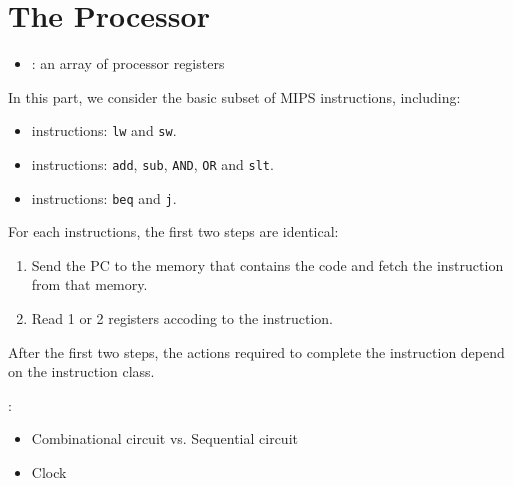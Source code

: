 \chapter{The Processor}

    \begin{itemize}
      \item {}: an array of processor registers
    \end{itemize}

    \par In this part, we consider the basic subset of MIPS instructions,
    including:
    \begin{itemize}
      \item {} instructions: \lstinline{lw} and
        \lstinline{sw}.
      \item {} instructions: \lstinline{add},
        \lstinline{sub}, \lstinline{AND}, \lstinline{OR} and \lstinline{slt}.
      \item {} instructions: \lstinline{beq} and \lstinline{j}.
    \end{itemize}
    \par For each instructions, the first two steps are identical:
    \begin{enumerate}[1.]
      \item Send the PC to the memory that contains the code and fetch the
        instruction from that memory.
      \item Read 1 or 2 registers accoding to the instruction.
    \end{enumerate}
    \par After the first two steps, the actions required to complete the
      instruction depend on the instruction class.


  \par {}:
    \begin{itemize}
      \item Combinational circuit vs. Sequential circuit
      \item Clock
    \end{itemize}

